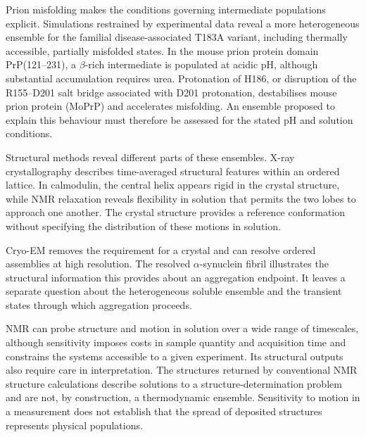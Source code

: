 Prion misfolding makes the conditions governing intermediate populations explicit. Simulations restrained by experimental data reveal a more heterogeneous ensemble for the familial disease-associated T183A variant, including thermally accessible, partially misfolded states.\supercite{biancanielloStructureDynamicsMisfolding2025} In the mouse prion protein domain PrP(121--231), a $\beta$-rich intermediate is populated at acidic pH, although substantial accumulation requires urea.\supercite{hornemannScrapielikeUnfoldingIntermediate1998} Protonation of H186, or disruption of the R155--D201 salt bridge associated with D201 protonation, destabilises mouse prion protein (MoPrP) and accelerates misfolding.\supercite{singhUnravelingMolecularMechanism2016} An ensemble proposed to explain this behaviour must therefore be assessed for the stated pH and solution conditions.

Structural methods reveal different parts of these ensembles. X-ray crystallography describes time-averaged structural features within an ordered lattice.\supercite{lisiAllosteryEnzymeCatalysis2017} In calmodulin, the central helix appears rigid in the crystal structure, while NMR relaxation reveals flexibility in solution that permits the two lobes to approach one another.\supercite{sapienzaUsingNMRStudy2010} The crystal structure provides a reference conformation without specifying the distribution of these motions in solution.

Cryo-EM removes the requirement for a crystal and can resolve ordered assemblies at high resolution.\supercite{baiHowCryoEMRevolutionizing2015} The resolved $\alpha$-synuclein fibril illustrates the structural information this provides about an aggregation endpoint. It leaves a separate question about the heterogeneous soluble ensemble and the transient states through which aggregation proceeds.

NMR can probe structure and motion in solution over a wide range of timescales, although sensitivity imposes costs in sample quantity and acquisition time and constrains the systems accessible to a given experiment.\supercite{klecknerIntroductionNMRbasedApproaches2011} Its structural outputs also require care in interpretation. The structures returned by conventional NMR structure calculations describe solutions to a structure-determination problem and are not, by construction, a thermodynamic ensemble.\supercite{bmsb2012ch12} Sensitivity to motion in a measurement does not establish that the spread of deposited structures represents physical populations.


